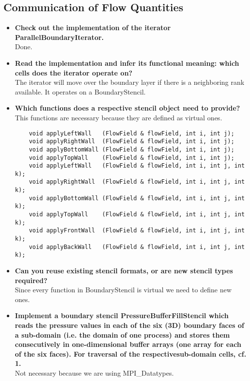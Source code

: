 \documentclass[a4paper]{article}
\begin{document}
\subsection{Communication of Flow Quantities}
\begin{itemize}
	\item \textbf{Check out the implementation of the iterator ParallelBoundaryIterator.}\\
	Done.
	\item \textbf{Read the implementation and infer its functional meaning: which cells does the iterator operate on?}\\
	The iterator will move over the boundary layer if there is a neighboring rank available. It operates on a BoundaryStencil.
	\item \textbf{Which functions does a respective stencil object need to provide?}\\
	This functions are necessary because they are defined as virtual ones.
	\begin{lstlisting}
	void applyLeftWall   (FlowField & flowField, int i, int j);
	void applyRightWall  (FlowField & flowField, int i, int j);
	void applyBottomWall (FlowField & flowField, int i, int j);
	void applyTopWall    (FlowField & flowField, int i, int j);
	void applyLeftWall   (FlowField & flowField, int i, int j, int k);
	void applyRightWall  (FlowField & flowField, int i, int j, int k);
	void applyBottomWall (FlowField & flowField, int i, int j, int k);
	void applyTopWall    (FlowField & flowField, int i, int j, int k);
	void applyFrontWall  (FlowField & flowField, int i, int j, int k);
	void applyBackWall   (FlowField & flowField, int i, int j, int k);
	\end{lstlisting}
	
	\item \textbf{Can you reuse existing stencil formats, or are new stencil types required?}\\
	Since every function in BoundaryStencil is virtual we need to define new ones.
	
	\item \textbf{Implement a boundary stencil PressureBufferFillStencil which reads the pressure values in each of the six (3D) boundary faces of a sub-domain (i.e. the domain of one process) and stores them consecutively in one-dimensional buffer arrays (one array for each of the six faces). For traversal of the respectivesub-domain cells, cf. 1.}\\
	Not necessary because we are using MPI\_Datatypes.
	

\end{itemize}
\end{document}

